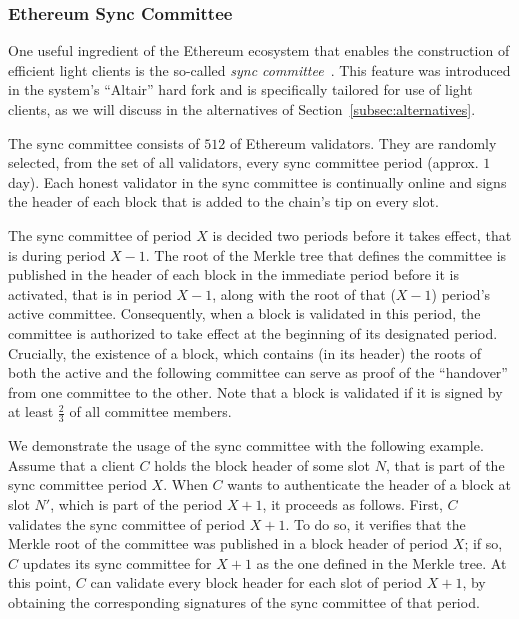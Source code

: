 

\subsubsection{Ethereum Sync Committee}\label{subsec:sync-committee}

One useful ingredient of the Ethereum ecosystem that enables the
construction of efficient light clients is the so-called \emph{sync committee}~\cite{sync-committee}.
This feature was introduced in the system's
``Altair'' hard fork and is specifically tailored for use of light clients, as
we will discuss in the alternatives of Section~\ref{subsec:alternatives}.

The sync committee consists of $512$ of Ethereum validators. They are randomly
selected, from the set of all validators, every sync committee period (approx.
$1$ day). Each honest validator in the sync committee is continually online and
signs the header of each block that is added to the chain's tip on every slot. 

The sync committee of period $X$ is decided two periods before it takes effect,
that is during period $X-1$. The root of the Merkle tree that defines the
committee is published in the header of each block in the immediate period
before it is activated, that is in period $X-1$, along with the root of that
($X-1$) period's active committee. Consequently, when a block is validated in
this period, the committee is authorized to take effect at the beginning of its
designated period. Crucially, the existence of a block, which contains (in its
header) the roots of both the active and the following committee can serve as
proof of the ``handover'' from one committee to the other. Note that a block is
validated if it is signed by at least $\frac{2}{3}$ of all committee members.

We demonstrate the usage of the sync committee with the following example.
Assume that a client $C$ holds the block header of some slot $N$, that is part
of the sync committee period $X$.  When $C$ wants to authenticate the header of
a block at slot $N'$, which is part of the period $X+1$, it proceeds as
follows.  First, $C$ validates the sync committee of period $X+1$. To do so, it
verifies that the Merkle root of the committee was published in a block header
of period $X$; if so, $C$ updates its sync committee for $X+1$ as the one
defined in the Merkle tree. At this point, $C$ can validate every block header
for each slot of period $X+1$, by obtaining the corresponding signatures of the
sync committee of that period.

